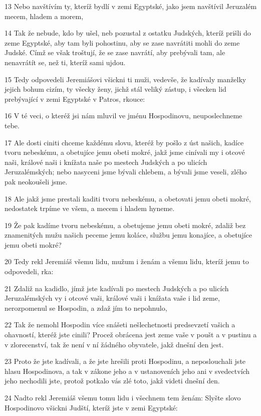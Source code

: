 \par 13 Nebo navštívím ty, kteríž bydlí v zemi Egyptské, jako jsem navštívil Jeruzalém mecem, hladem a morem,
\par 14 Tak že nebude, kdo by ušel, neb pozustal z ostatku Judských, kteríž prišli do zeme Egyptské, aby tam byli pohostinu, aby se zase navrátiti mohli do zeme Judské. Címž se však troštují, že se zase navrátí, aby prebývali tam, ale nenavrátít se, než ti, kteríž sami ujdou.
\par 15 Tedy odpovedeli Jeremiášovi všickni ti muži, vedevše, že kadívaly manželky jejich bohum cizím, ty všecky ženy, jichž stál veliký zástup, i všecken lid prebývající v zemi Egyptské v Patros, rkouce:
\par 16 V té veci, o kteréž jsi nám mluvil ve jménu Hospodinovu, neuposlechneme tebe.
\par 17 Ale dosti ciniti chceme každému slovu, kteréž by pošlo z úst našich, kadíce tvoru nebeskému, a obetujíce jemu obeti mokré, jakž jsme cinívali my i otcové naši, králové naši i knížata naše po mestech Judských a po ulicích Jeruzalémských; nebo nasyceni jsme bývali chlebem, a bývali jsme veseli, zlého pak neokoušeli jsme.
\par 18 Ale jakž jsme prestali kaditi tvoru nebeskému, a obetovati jemu obeti mokré, nedostatek trpíme ve všem, a mecem i hladem hyneme.
\par 19 Že pak kadíme tvoru nebeskému, a obetujeme jemu obeti mokré, zdaliž bez znamenitých mužu našich peceme jemu koláce, službu jemu konajíce, a obetujíce jemu obeti mokré?
\par 20 Tedy rekl Jeremiáš všemu lidu, mužum i ženám a všemu lidu, kteríž jemu to odpovedeli, rka:
\par 21 Zdaliž na kadidlo, jímž jste kadívali po mestech Judských a po ulicích Jeruzalémských vy i otcové vaši, králové vaši i knížata vaše i lid zeme, nerozpomenul se Hospodin, a zdaž jím to nepohnulo,
\par 22 Tak že nemohl Hospodin více snášeti nešlechetnosti predsevzetí vašich a ohavností, kteréž jste cinili? Procež obrácena jest zeme vaše v poušt a v pustinu a v zlorecenství, tak že není v ní žádného obyvatele, jakž dnešní den jest.
\par 23 Proto že jste kadívali, a že jste hrešili proti Hospodinu, a neposlouchali jste hlasu Hospodinova, a tak v zákone jeho a v ustanoveních jeho ani v svedectvích jeho nechodili jste, protož potkalo vás zlé toto, jakž videti dnešní den.
\par 24 Nadto rekl Jeremiáš všemu tomu lidu i všechnem tem ženám: Slyšte slovo Hospodinovo všickni Judští, kteríž jste v zemi Egyptské:
